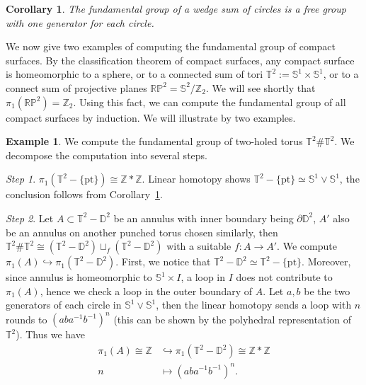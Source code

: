 \documentclass[a4paper]{amsart}
\theoremstyle{plain}
\newtheorem{cor}[thm]{Corollary}
\theoremstyle{definition}
\newtheorem{eg}[thm]{Example}
\theoremstyle{remark}
\begin{document}
\begin{cor}\label{wedge circle}
    The fundamental group of a wedge sum of circles is a free group with one generator for each circle.
\end{cor}

We now give two examples of computing the fundamental group of compact surfaces.
By the classification theorem of compact surfaces, any compact surface is homeomorphic to a sphere, or to a connected sum of tori $\mathbb{T}^2:=\mathbb{S}^1\times\mathbb{S}^1$, or to a connect sum of projective planes $\mathbb{RP}^2=\mathbb{S}^2/\mathbb{Z}_2$.
We will see shortly that $\pi_1(\mathbb{RP}^2)=\mathbb{Z}_2$.
Using this fact, we can compute the fundamental group of all compact surfaces by induction.
We will illustrate by two examples.

\begin{eg}
    We compute the fundamental group of two-holed torus $\mathbb{T}^2\#\mathbb{T}^2$.
    We decompose the computation into several steps.

    \emph{Step 1}. $\pi_1(\mathbb{T}^2-\{\mathrm{pt}\})\cong\mathbb{Z}*\mathbb{Z}$.
    Linear homotopy shows $\mathbb{T}^2-\{\mathrm{pt}\}\simeq\mathbb{S}^1\vee\mathbb{S}^1$, the conclusion follows from Corollary~\ref{wedge circle}.

    \emph{Step 2}. Let $A\subset\mathbb{T}^2-\mathbb{D}^2$ be an annulus with inner boundary being $\partial\mathbb{D}^2$, $A'$ also be an annulus on another punched torus chosen similarly, then $\mathbb{T}^2\#\mathbb{T}^2\cong(\mathbb{T}^2-\mathbb{D}^2)\sqcup_f(\mathbb{T}^2-\mathbb{D}^2)$ with a suitable $f:A\to A'$.
    We compute $\pi_1(A)\hookrightarrow\pi_1(\mathbb{T}^2-\mathbb{D}^2)$.
    First, we notice that $\mathbb{T}^2-\mathbb{D}^2\simeq\mathbb{T}^2-\{\mathrm{pt}\}$.
    Moreover, since annulus is homeomorphic to $\mathbb{S}^1\times I$, a loop in $I$ does not contribute to $\pi_1(A)$, hence we check a loop in the outer boundary of $A$.
    Let $a,b$ be the two generators of each circle in $\mathbb{S}^1\vee\mathbb{S}^1$, then the linear homotopy sends a loop with $n$ rounds to $(aba^{-1}b^{-1})^n$ (this can be shown by the polyhedral representation of $\mathbb{T}^2$).
    Thus we have
    \begin{align*}
        \pi_1(A)\cong\mathbb{Z}&\hookrightarrow\pi_1(\mathbb{T}^2-\mathbb{D}^2)\cong\mathbb{Z}*\mathbb{Z}\\
        n&\mapsto(aba^{-1}b^{-1})^n.
    \end{align*}


\end{eg}
\end{document}
